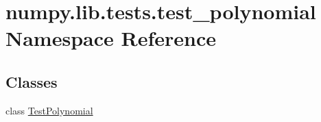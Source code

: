 \hypertarget{namespacenumpy_1_1lib_1_1tests_1_1test__polynomial}{}\section{numpy.\+lib.\+tests.\+test\+\_\+polynomial Namespace Reference}
\label{namespacenumpy_1_1lib_1_1tests_1_1test__polynomial}
\subsection*{Classes}
\begin{DoxyCompactItemize}
\item 
class \hyperlink{classnumpy_1_1lib_1_1tests_1_1test__polynomial_1_1TestPolynomial}{Test\+Polynomial}
\end{DoxyCompactItemize}
